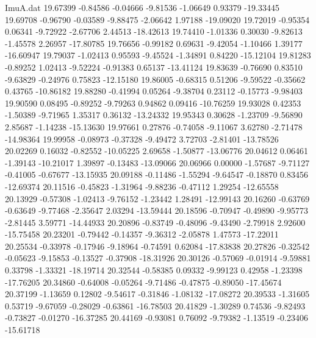 \begin{filecontents}{ImuA.dat}
  19.67399   -0.84586   -0.04666   -9.81536   -1.06649    0.93379  -19.33445
  19.69708   -0.96790   -0.03589   -9.88475   -2.06642    1.97188  -19.09020
  19.72019   -0.95354    0.06341   -9.72922   -2.67706    2.44513  -18.42613
  19.74410   -1.01336    0.30030   -9.82613   -1.45578    2.26957  -17.80785
  19.76656   -0.99182    0.69631   -9.42054   -1.10466    1.39177  -16.60947
  19.79037   -1.02413    0.95593   -9.45524   -1.34891    0.84220  -15.12104
  19.81283   -0.89252    1.02413   -9.52224   -0.91383    0.65137  -13.41124
  19.83639   -0.76690    0.83510   -9.63829   -0.24976    0.75823  -12.15180
  19.86005   -0.68315    0.51206   -9.59522   -0.35662    0.43765  -10.86182
  19.88280   -0.41994    0.05264   -9.38704    0.23112   -0.15773   -9.98403
  19.90590    0.08495   -0.89252   -9.79263    0.94862    0.09416  -10.76259
  19.93028    0.42353   -1.50389   -9.71965    1.35317    0.36132  -13.24332
  19.95343    0.30628   -1.23709   -9.56890    2.85687   -1.14238  -15.13630
  19.97661    0.27876   -0.74058   -9.11067    3.62780   -2.71478  -14.98364
  19.99958   -0.08973   -0.37328   -9.49472    3.72703   -2.81401  -13.78526
  20.02269    0.16032   -0.82552  -10.05225    2.69658   -1.50877  -13.06776
  20.04612    0.06461   -1.39143  -10.21017    1.39897   -0.13483  -13.09066
  20.06966    0.00000   -1.57687   -9.71127   -0.41005   -0.67677  -13.15935
  20.09188   -0.11486   -1.55294   -9.64547   -0.18870    0.83456  -12.69374
  20.11516   -0.45823   -1.31964   -9.88236   -0.47112    1.29254  -12.65558
  20.13929   -0.57308   -1.02413   -9.76152   -1.23442    1.28491  -12.99143
  20.16260   -0.63769   -0.63649   -9.77468   -2.35647    2.03294  -13.59444
  20.18596   -0.70947   -0.49890   -9.95773   -2.81445    3.59771  -14.44933
  20.20896   -0.83749   -0.48096   -9.43490   -2.79918    2.92600  -15.75458
  20.23201   -0.79442   -0.14357   -9.36312   -2.05878    1.47573  -17.22011
  20.25534   -0.33978   -0.17946   -9.18964   -0.74591    0.62084  -17.83838
  20.27826   -0.32542   -0.05623   -9.15853   -0.13527   -0.37908  -18.31926
  20.30126   -0.57069   -0.01914   -9.59881    0.33798   -1.33321  -18.19714
  20.32544   -0.58385    0.09332   -9.99123    0.42958   -1.23398  -17.76205
  20.34860   -0.64008   -0.05264   -9.71486   -0.47875   -0.89050  -17.45674
  20.37199   -1.13659    0.12802   -9.54617   -0.31846   -1.08132  -17.08272
  20.39533   -1.31605    0.53719   -9.67059   -0.28029   -0.63861  -16.78503
  20.41829   -1.30289    0.74536   -9.82493   -0.73827   -0.01270  -16.37285
  20.44169   -0.93081    0.76092   -9.79382   -1.13519   -0.23406  -15.61718

\end{filecontents}
